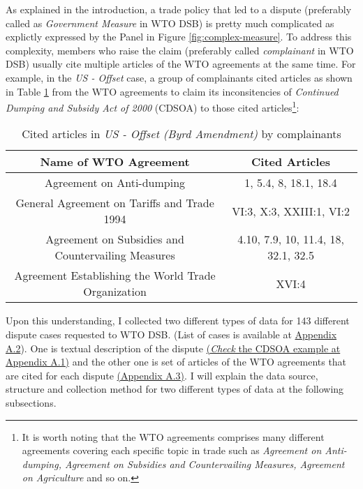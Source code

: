 As explained in the introduction,
a trade policy that led to a dispute (preferably called as \textit{Government Measure} in WTO DSB) is pretty much complicated as explictly expressed by the Panel in Figure \ref{fig:complex-measure}.
To address this complexity,
members who raise the claim (preferably called \textit{complainant} in WTO DSB) usually cite multiple articles of the WTO agreements at the same time. For example, in the
\textit{US - Offset} case,
a group of complainants
cited articles as shown in Table \ref{xltabular:cited-article-for-us-offset} from the WTO agreements to claim its inconsitencies of \textit{Continued Dumping and Subsidy Act of 2000} (CDSOA) to those cited articles\footnote{It is worth noting that the WTO agreements comprises many different agreements covering each specific topic in trade such as \textit{Agreement on Anti-dumping, Agreement on Subsidies and Countervailing Measures, Agreement on Agriculture} and so on.}:
\\
\begin{table}[h]
    \setlength\tabcolsep{15pt}
    \begin{tabular}{ c | c }
        \hline
        \textbf{\normalsize Name of WTO Agreement}          & \textbf{\normalsize Cited Articles} \\
        \hline \hline
        Agreement on Anti-dumping                           & 1, 5.4, 8, 18.1, 18.4               \\ \hline
        General Agreement on Tariffs and Trade 1994         & VI:3, X:3, XXIII:1, VI:2            \\ \hline
        Agreement on Subsidies and Countervailing Measures  & 4.10, 7.9, 10, 11.4, 18, 32.1, 32.5 \\ \hline
        Agreement Establishing the World Trade Organization & XVI:4                               \\ \hline
    \end{tabular}
    \caption{Cited articles in \textit{US - Offset (Byrd Amendment)} by complainants}
    \label{xltabular:cited-article-for-us-offset}
\end{table}

\noindent Upon this understanding,
I collected two different types of data for 143 different dispute cases requested to WTO DSB. (List of cases is
available at \hyperref[sub:cited-articles-table]{Appendix A.2}).
One is textual description of the dispute \hyperref[sub:factual-aspect-example]{(\textit{Check} the CDSOA example at Appendix A.1)} and the other one is
set of articles of the WTO agreements that are
cited for each dispute \hyperref[sub:cited-articles-table]{(Appendix A.3)}.
I will explain the data source, structure and collection method for two different types of data at the following subsections.\\


